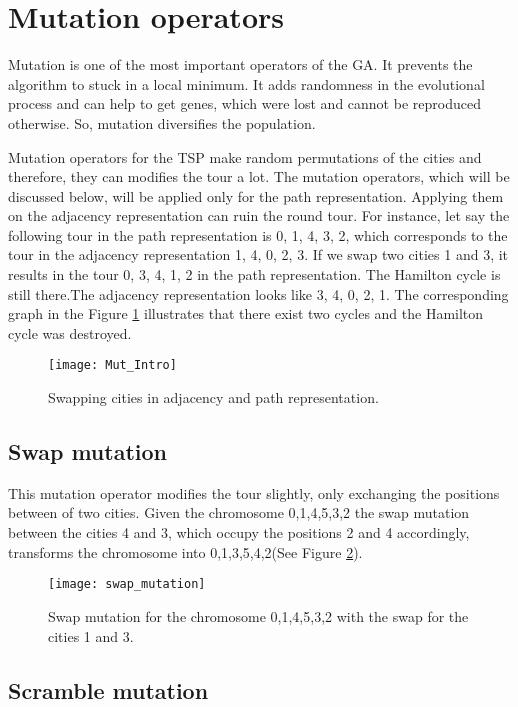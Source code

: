 \documentclass[a4paper, 12pt, headings=standardclasses]{scrartcl}
\begin{document}
\section{Mutation operators}
Mutation is one of the most important operators of the GA. It prevents the algorithm to stuck in a local minimum. It adds randomness in the evolutional process and can help to get genes, which were lost and cannot be reproduced otherwise. So, mutation diversifies the population.\par
Mutation operators for the TSP make random permutations of the cities and therefore, they can modifies the tour a lot. The mutation operators, which will be discussed below, will be applied only for the path representation. Applying them on the adjacency representation can ruin the round tour. For instance, let say the following tour in the path representation is 0, 1, 4, 3, 2, which corresponds to the tour in the adjacency representation 1, 4, 0, 2, 3. If we swap two cities 1 and 3, it results in the tour 0, 3, 4, 1, 2 in the path representation. The Hamilton cycle is still there.The adjacency representation looks like 3, 4, 0, 2, 1. The corresponding graph in the Figure \ref{mut_intro} illustrates that there exist two cycles and the Hamilton cycle was destroyed. \par

\begin{figure}[!ht]
	\centering
	\texttt{[image: Mut\_Intro]}
	\caption{Swapping cities in adjacency and path representation.}
	\label{mut_intro}
\end{figure}

\subsection{Swap mutation}
This mutation operator \cite{potvin1996genetic} modifies the tour slightly, only exchanging the positions between of two cities. Given the chromosome 0,1,4,5,3,2 the swap mutation between the cities 4 and 3, which occupy the positions 2 and 4 accordingly, transforms the chromosome into 0,1,3,5,4,2(See Figure \ref{swap_mutation}).

\begin{figure}[!ht]
	\centering
	\texttt{[image: swap\_mutation]}
	\caption{Swap mutation for the chromosome 0,1,4,5,3,2 with the swap for the cities 1 and 3.}
	\label{swap_mutation}
\end{figure}

\subsection{Scramble mutation}
\end{document}
